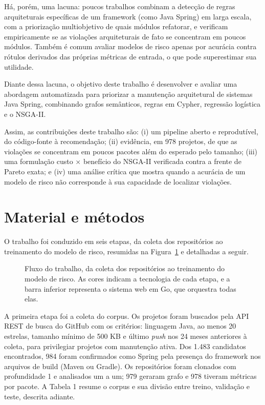 \documentclass[
  a4paper,
]{article}
\begin{document}
Há, porém, uma lacuna: poucos trabalhos combinam a detecção de regras arquiteturais específicas de um framework (como Java Spring) em larga escala, com a priorização multiobjetivo de quais módulos refatorar, e verificam empiricamente se as violações arquiteturais de fato se concentram em poucos módulos. Também é comum avaliar modelos de risco apenas por acurácia contra rótulos derivados das próprias métricas de entrada, o que pode superestimar sua utilidade.

Diante dessa lacuna, o objetivo deste trabalho é desenvolver e avaliar uma abordagem automatizada para priorizar a manutenção arquitetural de sistemas Java Spring, combinando grafos semânticos, regras em Cypher, regressão logística e o NSGA-II.

Assim, as contribuições deste trabalho são: (i) um pipeline aberto e reprodutível, do código-fonte à recomendação; (ii) evidência, em 978 projetos, de que as violações se concentram em poucos pacotes além do esperado pelo tamanho; (iii) uma formulação custo × benefício do NSGA-II verificada contra a frente de Pareto exata; e (iv) uma análise crítica que mostra quando a acurácia de um modelo de risco não corresponde à sua capacidade de localizar violações.

\hypertarget{material-e-muxe9todos}{%
\section{Material e métodos}\label{material-e-muxe9todos}}

O trabalho foi conduzido em seis etapas, da coleta dos repositórios ao treinamento do modelo de risco, resumidas na Figura~\ref{fig:fluxo-trabalho} e detalhadas a seguir.

\begin{figure}[htbp]
\centering

\caption{Fluxo do trabalho, da coleta dos repositórios ao treinamento do modelo de risco. As cores indicam a tecnologia de cada etapa, e a barra inferior representa o sistema web em Go, que orquestra todas elas.}
\label{fig:fluxo-trabalho}
\end{figure}

A primeira etapa foi a coleta do corpus. Os projetos foram buscados pela API REST de busca do GitHub com os critérios: linguagem Java, ao menos 20 estrelas, tamanho mínimo de 500 KB e último \emph{push} nos 24 meses anteriores à coleta, para privilegiar projetos com manutenção ativa. Dos 1.483 candidatos encontrados, 984 foram confirmados como Spring pela presença do framework nos arquivos de build (Maven ou Gradle). Os repositórios foram clonados com profundidade 1 e analisados um a um; 979 geraram grafo e 978 tiveram métricas por pacote. A Tabela 1 resume o corpus e sua divisão entre treino, validação e teste, descrita adiante.
\end{document}
